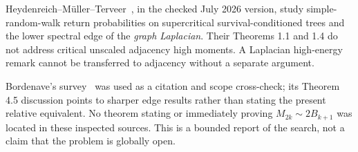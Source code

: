 \documentclass[11pt,letterpaper]{article}
\theoremstyle{remark}\newtheorem{remark}[theorem]{Remark}
\theoremstyle{definition}\newtheorem{definition}[theorem]{Definition}
\begin{document}
Heydenreich--M\"uller--Terveer~\cite{hmt}, in the checked July 2026 version, study simple-random-walk return probabilities on supercritical survival-conditioned trees and the lower spectral edge of the \emph{graph Laplacian}. Their Theorems 1.1 and 1.4 do not address critical unscaled adjacency high moments. A Laplacian high-energy remark cannot be transferred to adjacency without a separate argument.

Bordenave's survey~\cite{bordenave} was used as a citation and scope cross-check; its Theorem 4.5 discussion points to sharper edge results rather than stating the present relative equivalent. No theorem stating or immediately proving $M_{2k}\sim2B_{k+1}$ was located in these inspected sources. This is a bounded report of the search, not a claim that the problem is globally open.
\end{document}
